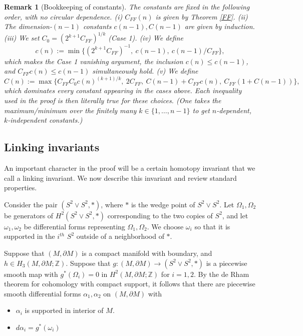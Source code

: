 \documentclass{amsart}
\newtheorem*{theorem 1}{Theorem 1}
\newtheorem*{theorem 2}{Theorem 2}
\newtheorem*{theorem 3}{Theorem 3}
\newtheorem{remark}{Remark}
\numberwithin{equation}{section}
\newcommand{\ZZ}{\mathbb{Z}}
\begin{document}
\begin{remark}[Bookkeeping of constants]
The constants are fixed in the following order, with no circular
dependence.  (i) $C_{FF}(n)$ is given by Theorem \ref{FF}.  (ii)
The dimension-$(n-1)$ constants $c(n-1),C(n-1)$ are given by
induction.  (iii) We set $C_0 = (2^{k+1}C_{FF})^{1/k}$ (Case 1).
(iv) We define
$$ c(n) := \min\Big\{ (2^{k+1}C_{FF})^{-1},\ c(n-1),\
   c(n-1)/C_{FF}\Big\}, $$
which makes the Case 1 vanishing argument, the inclusion
$c(n) \le c(n-1)$, and $C_{FF}c(n)\le c(n-1)$ simultaneously hold.
(v) We define
$$ C(n) := \max\Big\{ C_{FF}C_0 c(n)^{(k+1)/k},\
   2 C_{FF},\ C(n-1) + C_{FF}c(n),\
   C_{FF}(1 + C(n-1))\Big\}, $$
which dominates every constant appearing in the cases above.  Each
inequality used in the proof is then literally true for these
choices.  (One takes the maximum/minimum over the finitely many
$k \in \{1,\dots,n-1\}$ to get $n$-dependent, $k$-independent
constants.)
\end{remark}



\subsection{Linking invariants}


An important character in the proof will be a certain homotopy invariant that we call a linking invariant.   We now describe this invariant and review standard properties.

 Consider the pair $(S^2 \vee S^2, *)$,  where $*$ is the wedge point of $S^2 \vee S^2$.    Let $\Omega_1, \Omega_2$ be generators of $H^2(S^2 \vee S^2,  *)$ corresponding to the two copies of $S^2$,  and let $\omega_1, \omega_2$ be differential forms representing $\Omega_1,  \Omega_2$.   We choose $\omega_i$ so that it is supported in the $i^{th}$ $S^2$ outside of a neighborhood of $*$. 

Suppose that $(M,  \partial M)$ is a compact manifold with boundary,  and $h \in H_3(M,  \partial M; \ZZ)$.   Suppose that $g: (M,  \partial M) \rightarrow (S^2 \vee S^2,  *)$ is a piecewise smooth map with $g^*(\Omega_i) = 0$ in $H^2(M,  \partial M; \ZZ)$ for $i=1,2$.   By the de Rham theorem for cohomology with compact support,  it follows that there are piecewise smooth differential forms $\alpha_1,  \alpha_2$ on $(M, \partial M)$ with

\begin{itemize}

\item $\alpha_i$ is supported in interior of $M$.

\item $d \alpha_i = g^*(\omega_i)$

\end{itemize}
\end{document}
